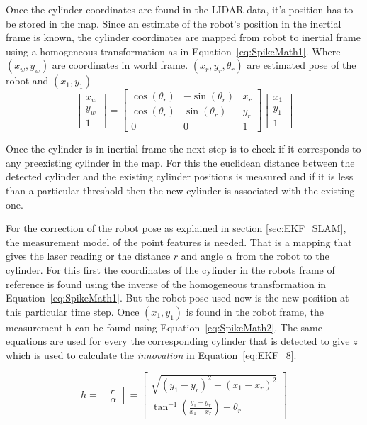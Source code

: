 Once the cylinder coordinates are found in the LIDAR data, it's position has to be stored in the map.  Since an estimate of the robot's position in the inertial frame is known, the cylinder coordinates are mapped from robot to inertial frame using a homogeneous transformation as in Equation~\ref{eq:SpikeMath1}. Where $ (x_w,y_w) $ are coordinates in world frame. $ (x_r,y_r,\theta_r) $ are estimated pose of the robot and $ (x_1,y_1) $
\begin{equation}
\begin{bmatrix}
x_w\\y_w\\1
\end{bmatrix}=
\begin{bmatrix}
\cos(\theta_r) & -\sin(\theta_r) & x_r\\
\cos(\theta_r) & \sin(\theta_r) & y_r\\
0 & 0 & 1
\end{bmatrix}
\begin{bmatrix}
x_1\\y_1\\1
\end{bmatrix}
\label{eq:SpikeMath1}
\end{equation}

Once the cylinder is in inertial frame the next step is to check if it corresponds to any preexisting cylinder in the map. For this the euclidean distance between the detected cylinder and the existing cylinder positions is measured and if it is less than a particular threshold then the new cylinder is associated with the existing one. 

For the correction of the robot pose as explained in section \ref{sec:EKF_SLAM}, the measurement model of the point features is needed. That is a mapping that gives the laser reading or the distance $ r $ and angle $ \alpha $ from the robot to the cylinder. For this first the coordinates of the cylinder in the robots frame of reference is found using the inverse of the homogeneous transformation in Equation~\ref{eq:SpikeMath1}. But the robot pose used now is the new position at this particular time step. Once $ (x_1,y_1) $ is found in the robot frame, the measurement h can be found using Equation~\ref{eq:SpikeMath2}. The same equations are used for every the corresponding cylinder that is detected to give $ z $ which is used to calculate the \textit{innovation} in Equation~\ref{eq:EKF_8}.

\begin{equation}
	\label{eq:SpikeMath2}
	h=\begin{bmatrix}
	r\\\alpha
	\end{bmatrix}=
	\begin{bmatrix}
	\sqrt{(y_1-y_r)^2+(x_1-x_r)^2} \\
	\tan^{-1}\left(\frac{y_1-y_r}{x_1-x_r}\right)-\theta_r
	\end{bmatrix}
\end{equation}

